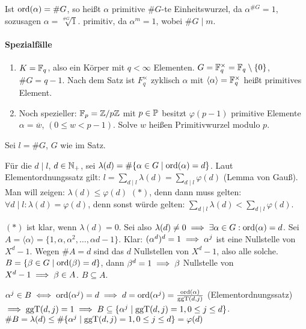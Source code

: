 \documentclass[a4paper,DIV15,BCOR12mm]{article}
\begin{document}
\begin{bemerkung}
Ist $\mathop{\rm ord}\nolimits(\alpha)=\#G$, so heißt $\alpha$ primitive $\#G$-te
Einheitswurzel, da $\alpha^{\#G}=1$, sozusagen $\alpha =
\sqrt[\#G]{1}$. primitiv, da $\alpha^m=1$, wobei $\#G\mid m$.
\end{bemerkung}

\paragraph{Spezialfälle}
\begin{enumerate}
\item $K=\mathbb{F}_q$, also ein Körper mit $q<\infty$ Elementen. $G=\mathbb{F}_q^\times=\mathbb{F}_q\setminus\{0\}$, $\#G=q-1$. Nach dem Satz ist $F_q^\times$ zyklisch $\alpha$ mit $\langle \alpha\rangle=\mathbb{F}_q^\times$ heißt primitives Element.
\item Noch spezieller: $\mathbb{F}_p = \mathbb{Z}/p\mathbb{Z}$ mit $p\in\mathbb{P}$ besitzt $\varphi(p-1)$ primitive Elemente $\alpha = \overline w$, $(0\le w < p-1)$. Solve $w$ heißen Primitivwurzel modulo $p$.
\end{enumerate}

\begin{beweis}
Sei $l = \#G$, $G$ wie im Satz.

Für die $d\mid l$, $d\in\mathbb{N}_+$, sei $\lambda(d)=\#\{\alpha \in G\mid
\mathop{\rm ord}\nolimits(\alpha)=d\}$. Laut Elementordnungssatz gilt: $l = \sum_{d\mid
l}\lambda(d) = \sum_{d\mid l} \varphi(d)$ (Lemma von Gauß). Man will
zeigen: $\lambda(d)\le \varphi(d)$ $(*)$, denn dann muss gelten:
$\forall d\mid l: \lambda(d)=\varphi(d)$, denn sonst würde gelten:
$\sum_{d\mid l}\lambda(d) < \sum_{d\mid l} \varphi(d)$.

$(*)$ ist klar, wenn $\lambda(d) = 0$. Sei also $\lambda(d)\ne 0
\implies \exists \alpha \in G: \mathop{\rm ord}\nolimits(\alpha) = d$. Sei $A=\langle
\alpha \rangle = \{1,\alpha,\alpha^2,\ldots,\alpha{d-1}\}$. Klar:
$(\alpha^d)^d = 1 \implies \alpha^j$ ist eine Nullstelle von $X^d-1$.
Wegen $\#A = d$ sind das $d$ Nullstellen von $X^d-1$, also alle
solche. $B=\{\beta \in G\mid \mathop{\rm ord}\nolimits(\beta) = d \}$, dann $\beta^d = 1
\implies \beta$ Nullstelle von $X^d-1\implies \beta\in A$. $B\subseteq
A$.

$\alpha^j\in B \iff \mathop{\rm ord}\nolimits(\alpha^j) = d \implies d= \mathop{\rm ord}\nolimits(\alpha^j) =
\frac{\mathop{\rm ord}\nolimits(\alpha)}{\mathop{\rm ggT}\nolimits(d,j)}$ (Elementordnungssatz) $\implies
\mathop{\rm ggT}\nolimits(d,j) = 1 \implies B\subseteq \{\alpha ^j \mid \mathop{\rm ggT}\nolimits(d,j)=1, 0\le j
\le d\}$. $\#B=\lambda(d)\le \#\{\alpha ^j \mid \mathop{\rm ggT}\nolimits(d,j)=1, 0\le j
\le d\} = \varphi(d)$

\end{beweis}
\end{document}
